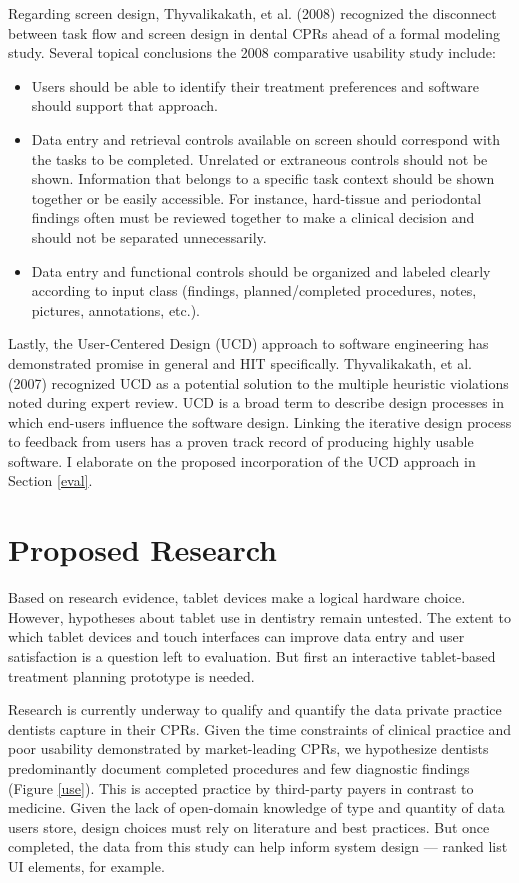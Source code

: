\documentclass[11pt]{article}
\begin{document}
Regarding screen design, Thyvalikakath, et al. (2008) recognized the disconnect between task flow and screen design in dental CPRs ahead of a formal modeling study. Several topical conclusions the 2008 comparative usability study include: \begin{itemize}
\item Users should be able to identify their treatment preferences and software should support that approach.
\item Data entry and retrieval controls available on screen should correspond with the tasks to be completed. Unrelated or extraneous controls should not be shown. Information that belongs to a specific task context should be shown together or be easily accessible. For instance, hard-tissue and periodontal findings often must be reviewed together to make a clinical decision and should not be separated unnecessarily.
\item Data entry and functional controls should be organized and labeled clearly according to input class (findings, planned/completed procedures, notes, pictures, annotations, etc.).
\end{itemize}

Lastly, the User-Centered Design (UCD) approach to software engineering has demonstrated promise in general\cite{Bannon1986Issues-in-desig,Wixon1997The-usability-e,Gould1997How-to-design-u,Abras2004Encycolopeida-o} and HIT specifically\cite{Johnson2005A-user-centered}. Thyvalikakath, et al. (2007) recognized UCD as a potential solution to the multiple heuristic violations noted during expert review. UCD is a broad term to describe design processes in which end-users influence the software design. Linking the iterative design process to feedback from users has a proven track record of producing highly usable software. I elaborate on the proposed incorporation of the UCD approach in Section \ref{eval}.

\section{Proposed Research}
Based on research evidence, tablet devices make a logical hardware choice. However, hypotheses about tablet use in dentistry remain untested. The extent to which tablet devices and touch interfaces can improve data entry and user satisfaction is a question left to evaluation. But first an interactive tablet-based treatment planning prototype is needed.

Research is currently underway to qualify and quantify the data private practice dentists capture in their CPRs. Given the time constraints of clinical practice and poor usability demonstrated by market-leading CPRs, we hypothesize dentists predominantly document completed procedures and few diagnostic findings (Figure \ref{use}). This is accepted practice by third-party payers in contrast to medicine. Given the lack of open-domain knowledge of type and quantity of data users store, design choices must rely on literature and best practices. But once completed, the data from this study can help inform system design --- ranked list UI elements, for example.
\end{document}
